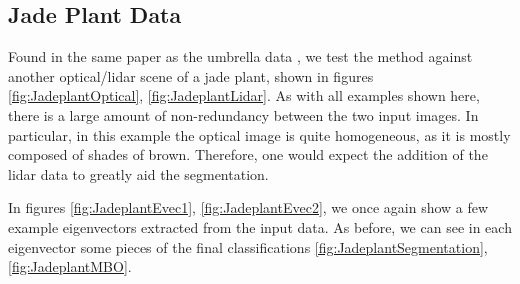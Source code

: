 \documentclass[journal]{IEEEtran}
\begin{document}
\subsection{Jade Plant Data}

Found in the same paper as the umbrella data \cite{Scharstein14}, we test the
method against another optical/lidar scene of a jade plant, shown in figures
\ref{fig:JadeplantOptical}, \ref{fig:JadeplantLidar}. As with all examples shown
here, there is a large amount of non-redundancy between the two input images. In
particular, in this example the optical image is quite homogeneous, as it is
mostly composed of shades of brown. Therefore, one would expect the addition of
the lidar data to greatly aid the segmentation.

In figures \ref{fig:JadeplantEvec1}, \ref{fig:JadeplantEvec2}, we once again
show a few example eigenvectors extracted from the input data. As before, we can
see in each eigenvector some pieces of the final classifications
\ref{fig:JadeplantSegmentation}, \ref{fig:JadeplantMBO}.
\end{document}

